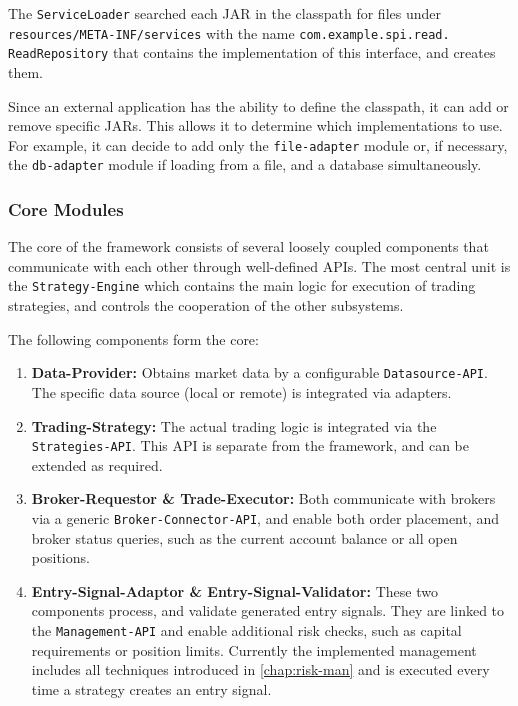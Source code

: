 The \texttt{ServiceLoader} searched each JAR in the classpath for files under \\\texttt{resources/META-INF/services} with the name \texttt{com.example.spi.read.}\\\texttt{ReadRepository} that contains the implementation of this interface, and creates them.

Since an external application has the ability to define the classpath, it can add or remove specific JARs.
This allows it to determine which implementations to use.
For example, it can decide to add only the \texttt{file-adapter} module or, if necessary, the \texttt{db-adapter} module if loading from a file, and a database simultaneously.

\subsubsection{Core Modules}

The core of the framework consists of several loosely coupled components that communicate with each other through well-defined APIs.
The most central unit is the \texttt{Strategy-Engine} which contains the main logic for execution of trading strategies, and controls the cooperation of the other subsystems.

The following components form the core:

\begin{enumerate}
    \item \textbf{Data-Provider:} Obtains market data by a configurable \texttt{Datasource-API}.
    The specific data source (local or remote) is integrated via adapters.
    \item \textbf{Trading-Strategy:} The actual trading logic is integrated via the \texttt{Strategies-API}.
    This API is separate from the framework, and can be extended as required.
    \item \textbf{Broker-Requestor \& Trade-Executor:} Both communicate with brokers via a generic \texttt{Broker-Connector-API}, and enable both order placement, and broker status queries, such as the current account balance or all open positions.
    \item \textbf{Entry-Signal-Adaptor \& Entry-Signal-Validator:} These two components process, and validate generated entry signals.
    They are linked to the \texttt{Management-API} and enable additional risk checks, such as capital requirements or position limits.
    Currently the implemented management includes all techniques introduced in \autoref{chap:risk-man} and is executed every time a strategy creates an entry signal.
\end{enumerate}

